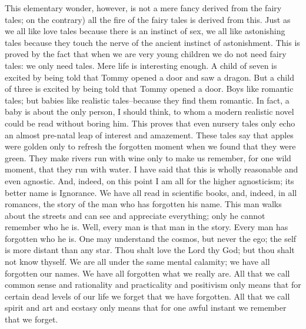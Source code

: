 \documentclass{book}
\begin{document}
This elementary wonder, however, is not a mere fancy derived from the fairy tales; on the contrary) all the fire of the fairy tales is derived from this. Just as we all like love tales because there is an instinct of sex, we all like astonishing tales because they touch the nerve of the ancient instinct of astonishment. This is proved by the fact that when we are very young children we do not need fairy tales: we only need tales. Mere life is interesting enough. A child of seven is excited by being told that Tommy opened a door and saw a dragon. But a child of three is excited by being told that Tommy opened a door. Boys like romantic tales; but babies like realistic tales–because they find them romantic. In fact, a baby is about the only person, I should think, to whom a modern realistic novel could be read without boring him. This proves that even nursery tales only echo an almost pre-natal leap of interest and amazement. These tales say that apples were golden only to refresh the forgotten moment when we found that they were green. They make rivers run with wine only to make us remember, for one wild moment, that they run with water. I have said that this is wholly reasonable and even agnostic. And, indeed, on this point I am all for the higher agnosticism; its better name is Ignorance. We have all read in scientific books, and, indeed, in all romances, the story of the man who has forgotten his name. This man walks about the streets and can see and appreciate everything; only he cannot remember who he is. Well, every man is that man in the story. Every man has forgotten who he is. One may understand the cosmos, but never the ego; the self is more distant than any star. Thou shalt love the Lord thy God; but thou shalt not know thyself. We are all under the same mental calamity; we have all forgotten our names. We have all forgotten what we really are. All that we call common sense and rationality and practicality and positivism only means that for certain dead levels of our life we forget that we have forgotten. All that we call spirit and art and ecstasy only means that for one awful instant we remember that we forget.
\end{document}
